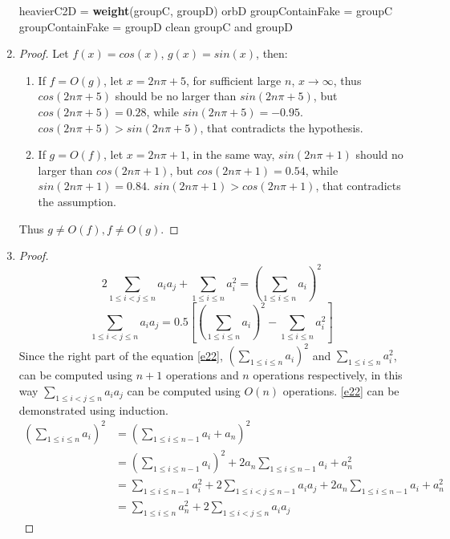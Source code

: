 \documentclass[paper=a4, fontsize=11pt]{scrartcl} %
\numberwithin{equation}{section} %
\numberwithin{figure}{section} %
\numberwithin{table}{section} %
\begin{document}
\begin{enumerate}
\begin{algorithm}
\begin{algorithmic}
	\STATE heavierC2D = \textbf{weight}(groupC, groupD)
			\RETURN orbD		
			\STATE groupContainFake = groupC
		\ELSE
			\STATE groupContainFake = groupD
		\ENDIF
		\STATE clean groupC and groupD
\ENDWHILE
\end{algorithmic}
\end{algorithm}
\newpage
\item
\begin{proof}
Let $f(x) = cos(x)$, $g(x)=sin(x)$, then:
\begin{enumerate}
\item If $f=O(g)$, let $x=2n\pi+5$, for sufficient large $n$, $x\rightarrow \infty$, thus $cos(2n\pi+5)$ should be no larger than $sin(2n\pi+5)$, but $cos(2n\pi+5)=0.28$, while $sin(2n\pi+5)=-0.95$. $cos(2n\pi+5)>sin(2n\pi+5)$, that contradicts the hypothesis.
\item If $g=O(f)$, let $x=2n\pi+1$, in the same way, $sin(2n\pi+1)$ should no larger than $cos(2n\pi+1)$, but $cos(2n\pi+1)=0.54$, while $sin(2n\pi+1)=0.84$. $sin(2n\pi+1)>cos(2n\pi+1)$, that contradicts the assumption.
\end{enumerate} 
Thus $g \neq O(f), f \neq O(g)$.
\qedhere
\end{proof}
\item
\begin{proof}
\begin{equation}
2\sum\limits_{1 \leq i<j \leq n} a_i a_j + \sum\limits_{1\leq i\leq n}a_i^2 = (\sum\limits_{1\leq i\leq n} a_i)^2
\end{equation}
\begin{equation}\label{e22}
\sum\limits_{1 \leq i<j \leq n} a_i a_j=0.5[(\sum\limits_{1\leq i\leq n} a_i)^2-\sum\limits_{1\leq i\leq n}a_i^2]
\end{equation}
Since the right part of the equation \ref{e22}, $(\sum\limits_{1\leq i\leq n} a_i)^2$ and $\sum\limits_{1\leq i \leq n}a_i^2$, can be computed using $n+1$ operations and $n$ operations respectively, in this way $\sum\limits_{1 \leq i<j \leq n} a_i a_j$ can be computed using $O(n)$ operations.
\ref{e22} can be demonstrated using induction.
\begin{equation}
\begin{split}
(\sum\limits_{1\leq i \leq n}a_i)^2 & =(\sum\limits_{1\leq i\leq n-1}a_i + a_n)^2 \\
& = (\sum\limits_{1\leq i \leq n-1}a_i)^2 + 2a_n\sum\limits_{1\leq i \leq n-1} a_i+a_n^2 \\
& = \sum\limits_{1\leq i \leq n-1}a_i^2+2\sum\limits_{1\leq i<j\leq n-1}a_i a_j + 2a_n\sum\limits_{1\leq i \leq n-1} a_i+a_n^2 \\
& = \sum\limits_{1\leq i \leq n}a_n^2 + 2\sum\limits_{1\leq i<j\leq n}a_i a_j
\end{split}
\end{equation}
\qedhere
\end{proof}
\end{enumerate}
\end{document}
